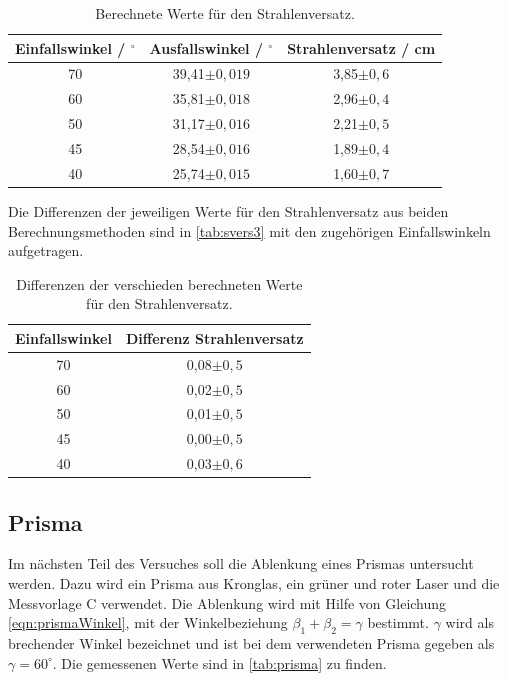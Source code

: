 \begin{table}[H]
  \centering
  \caption{Berechnete Werte für den Strahlenversatz.}
  \label{tab:svers2}
  \begin{tabular}{c c c}
    \toprule
    Einfallswinkel / $^{\circ}$ & Ausfallswinkel / $^{\circ}$ & Strahlenversatz / \si{\centi\meter} \\
    \midrule
    70 & 39,41$\pm 0,019$ & 3,85$\pm 0,6$\\
    60 & 35,81$\pm 0,018$ & 2,96$\pm 0,4$\\
    50 & 31,17$\pm 0,016$ & 2,21$\pm 0,5$\\
    45 & 28,54$\pm 0,016$ & 1,89$\pm 0,4$\\
    40 & 25,74$\pm 0,015$ & 1,60$\pm 0,7$\\
    \bottomrule
  \end{tabular}
\end{table}

\noindent
Die Differenzen der jeweiligen Werte für den Strahlenversatz aus beiden Berechnungsmethoden sind in \autoref{tab:svers3} mit den zugehörigen Einfallswinkeln aufgetragen. 

\begin{table}[H]
  \centering
  \caption{Differenzen der verschieden berechneten Werte für den Strahlenversatz.}
  \label{tab:svers3}
  \begin{tabular}{c c}
    \toprule
    Einfallswinkel & Differenz Strahlenversatz\\
    \midrule
    70 & 0,08$\pm 0,5$\\
    60 & 0,02$\pm 0,5$\\
    50 & 0,01$\pm 0,5$\\
    45 & 0,00$\pm 0,5$\\
    40 & 0,03$\pm 0,6$\\
    \bottomrule
  \end{tabular}
\end{table}

\subsection{Prisma}

Im nächsten Teil des Versuches soll die Ablenkung eines Prismas untersucht werden. Dazu wird ein Prisma aus Kronglas, ein grüner und roter Laser und die Messvorlage C
verwendet. Die Ablenkung wird mit Hilfe von Gleichung \eqref{eqn:prismaWinkel}, mit der Winkelbeziehung $\beta_1 + \beta_2 = \gamma$ bestimmt. $\gamma$ wird
als brechender Winkel bezeichnet und ist bei dem verwendeten Prisma gegeben als $\gamma = 60^{\circ}$.
\newline
Die gemessenen Werte sind in \autoref{tab:prisma} zu finden.

